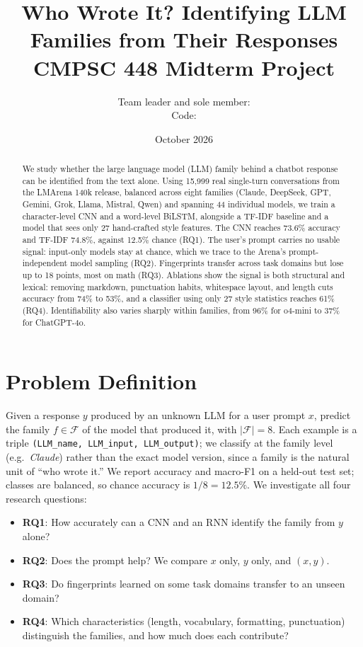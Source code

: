 \documentclass[11pt]{article}
\title{\textbf{Who Wrote It? Identifying LLM Families from Their Responses}\\[2pt]
\large CMPSC 448 Midterm Project}
\author{Team leader and sole member: \todo{Full name}\\
\small Code: \todo{GitHub repository URL}}
\date{October 2026}
\newcommand{\pct}[1]{#1\%}
\begin{document}
\maketitle

\begin{abstract}
We study whether the large language model (LLM) family behind a chatbot response can be identified from the text alone. Using 15{,}999 real single-turn conversations from the LMArena 140k release, balanced across eight families (Claude, DeepSeek, GPT, Gemini, Grok, Llama, Mistral, Qwen) and spanning 44 individual models, we train a character-level CNN and a word-level BiLSTM, alongside a TF-IDF baseline and a model that sees only 27 hand-crafted style features. The CNN reaches \pct{73.6} accuracy and TF-IDF \pct{74.8}, against \pct{12.5} chance (RQ1). The user's prompt carries no usable signal: input-only models stay at chance, which we trace to the Arena's prompt-independent model sampling (RQ2). Fingerprints transfer across task domains but lose up to 18 points, most on math (RQ3). Ablations show the signal is both structural and lexical: removing markdown, punctuation habits, whitespace layout, and length cuts accuracy from \pct{74} to \pct{53}, and a classifier using only 27 style statistics reaches \pct{61} (RQ4). Identifiability also varies sharply within families, from \pct{96} for o4-mini to \pct{37} for ChatGPT-4o.
\end{abstract}

\section{Problem Definition}
Given a response $y$ produced by an unknown LLM for a user prompt $x$, predict the family $f \in \mathcal{F}$ of the model that produced it, with $|\mathcal{F}| = 8$. Each example is a triple \texttt{(LLM\_name, LLM\_input, LLM\_output)}; we classify at the family level (e.g.\ \textit{Claude}) rather than the exact model version, since a family is the natural unit of ``who wrote it.'' We report accuracy and macro-F1 on a held-out test set; classes are balanced, so chance accuracy is $1/8 = \pct{12.5}$. We investigate all four research questions:
\begin{itemize}
  \item \textbf{RQ1}: How accurately can a CNN and an RNN identify the family from $y$ alone?
  \item \textbf{RQ2}: Does the prompt help? We compare $x$ only, $y$ only, and $(x, y)$.
  \item \textbf{RQ3}: Do fingerprints learned on some task domains transfer to an unseen domain?
  \item \textbf{RQ4}: Which characteristics (length, vocabulary, formatting, punctuation) distinguish the families, and how much does each contribute?
\end{itemize}
\end{document}
